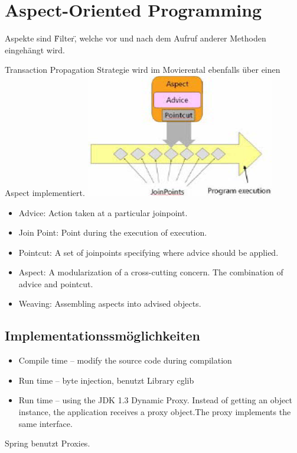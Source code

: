 \documentclass[10pt]{scrartcl}
\begin{document}
\newpage
\section{Aspect-Oriented Programming}
Aspekte sind \"Filter\", welche vor und nach dem Aufruf anderer Methoden eingehängt wird.

Transaction Propagation Strategie wird im Movierental ebenfalls über einen Aspect implementiert.\newline
\includegraphics[scale=1.0]{aopterminology.png}\\
\begin{itemize}
	\item Advice: Action taken at a particular joinpoint.
	\item Join Point: Point during the execution of execution.
	\item Pointcut: A set of joinpoints specifying where advice should be applied.
	\item Aspect: A modularization of a cross-cutting concern. The combination of advice and pointcut.
	\item Weaving: Assembling aspects into advised objects.
\end{itemize}

\subsection{Implementationssmöglichkeiten}
\begin{itemize}
	\item Compile time – modify the source code during compilation
	\item Run time – byte injection, benutzt Library cglib
	\item Run time – using the JDK 1.3 Dynamic Proxy. Instead of getting an object instance, the application receives a proxy object.The proxy implements the same interface.
\end{itemize}
Spring benutzt Proxies.
\end{document}
